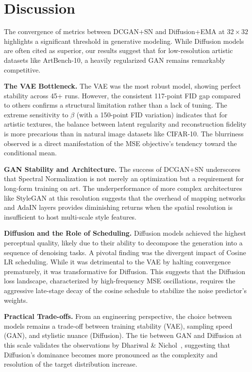 \documentclass[runningheads]{llncs}
\begin{document}
\section{Discussion}\label{sec:discussion}

The convergence of metrics between DCGAN+SN and Diffusion+EMA at $32\times 32$ highlights a significant threshold in generative modeling. While Diffusion models are often cited as superior, our results suggest that for low-resolution artistic datasets like ArtBench-10, a heavily regularized GAN remains remarkably competitive.

\textbf{The VAE Bottleneck.} The VAE was the most robust model, showing perfect stability across 45+ runs. However, the consistent 117-point FID gap compared to others confirms a structural limitation rather than a lack of tuning. The extreme sensitivity to $\beta$ (with a 150-point FID variation) indicates that for artistic textures, the balance between latent regularity and reconstruction fidelity is more precarious than in natural image datasets like CIFAR-10. The blurriness observed is a direct manifestation of the MSE objective's tendency toward the conditional mean.

\textbf{GAN Stability and Architecture.} The success of DCGAN+SN underscores that Spectral Normalization is not merely an optimization but a requirement for long-form training on art. The underperformance of more complex architectures like StyleGAN at this resolution suggests that the overhead of mapping networks and AdaIN layers provides diminishing returns when the spatial resolution is insufficient to host multi-scale style features.

\textbf{Diffusion and the Role of Scheduling.} Diffusion models achieved the highest perceptual quality, likely due to their ability to decompose the generation into a sequence of denoising tasks. A pivotal finding was the divergent impact of Cosine LR scheduling. While it was detrimental to the VAE by halting convergence prematurely, it was transformative for Diffusion. This suggests that the Diffusion loss landscape, characterized by high-frequency MSE oscillations, requires the aggressive late-stage decay of the cosine schedule to stabilize the noise predictor's weights.

\textbf{Practical Trade-offs.} From an engineering perspective, the choice between models remains a trade-off between training stability (VAE), sampling speed (GAN), and stylistic nuance (Diffusion). The tie between GAN and Diffusion at this scale validates the observations by Dhariwal & Nichol~\cite{dhariwal2021}, suggesting that Diffusion's dominance becomes more pronounced as the complexity and resolution of the target distribution increase.
\end{document}
